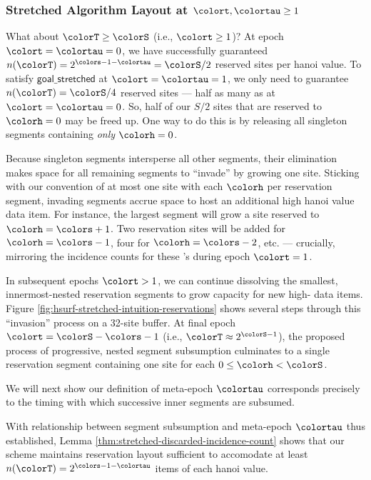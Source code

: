 \subsubsection{Stretched Algorithm Layout at $\colort,\colortau\geq1$}

What about $\colorT \geq \colorS$ (i.e., $\colort \geq 1$)?
At epoch $\colort=\colortau=0$, we have successfully guaranteed $n(\colorT) = 2^{\colors - 1 - \colortau} = \colorS / 2$ reserved sites per hanoi value.
To satisfy $\textsf{goal\_stretched}$ at $\colort=\colortau=1$, we only need to guarantee $n(\colorT) = \colorS/4$ reserved sites --- half as many as at $\colort=\colortau=0$.
So, half of our $S/2$ sites that are reserved to \hv{} $\colorh=0$ may be freed up.
One way to do this is by releasing all singleton segments containing \textit{only} \hv{} $\colorh=0$.

Because singleton segments intersperse all other segments, their elimination makes space for all remaining segments to ``invade'' by growing one site.
Sticking with our convention of at most one site with each \hv{} $\colorh$ per reservation segment, invading segments accrue space to host an additional high hanoi value data item.
For instance, the largest segment will grow a site reserved to \hv{} $\colorh=\colors +1$.
Two reservation sites will be added for \hv{} $\colorh=\colors - 1$, four for \hv{} $\colorh=\colors - 2$, etc. --- crucially, mirroring the incidence counts for these \hv{}'s during epoch $\colort=1$.

In subsequent epochs $\colort>1$, we can continue dissolving the smallest, innermost-nested reservation segments to grow capacity for new high-\hv{} data items.
Figure \ref{fig:hsurf-stretched-intuition-reservations} shows several steps through this ``invasion'' process on a 32-site buffer.
At final epoch $\colort=\colorS-\colors - 1$ (i.e., $\colorT \approx 2^{\colorS - 1}$), the proposed process of progressive, nested segment subsumption culminates to a single reservation segment containing one site for each \hv{} $0 \leq \colorh < \colorS$.

We will next show our definition of meta-epoch $\colortau$ corresponds precisely to the timing with which successive inner segments are subsumed.



With relationship between segment subsumption and meta-epoch $\colortau$ thus established, Lemma \ref{thm:stretched-discarded-incidence-count} shows that our scheme maintains reservation layout sufficient to accomodate at least $n(\colorT) = 2^{\colors - 1 - \colortau}$ items of each hanoi value.

